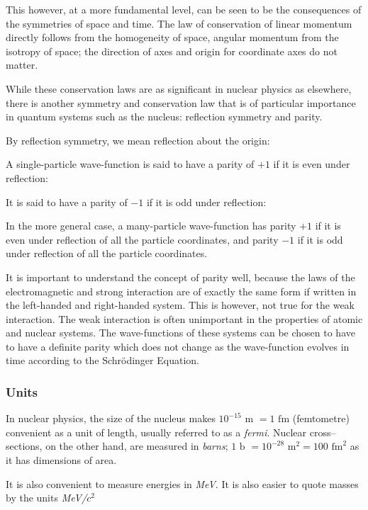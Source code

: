 This however, at a more fundamental level, can be seen to be the consequences of the symmetries of space and time. The law of conservation of linear momentum directly follows from the homogeneity of space, angular momentum from the isotropy of space; the direction of axes and origin for coordinate axes do not matter.

While these conservation laws are as significant in nuclear physics as elsewhere, there is another symmetry and conservation law that is of particular importance in quantum systems such as the nucleus: reflection symmetry and parity.

By reflection symmetry, we mean reflection about the origin:

A single-particle wave-function is said to have a parity of $+1$ if it is even under reflection:

It is said to have a parity of $-1$ if it is odd under reflection:

In the more general case, a many-particle wave-function has parity $+1$ if it is even under reflection of all the particle coordinates, and parity $-1$ if it is odd under reflection of all the particle coordinates.

It is important to understand the concept of parity well, because the laws of the electromagnetic and strong interaction are of exactly the same form if written in the left-handed and right-handed system. This is however, not true for the weak interaction. The weak interaction is often unimportant in the properties of atomic and nuclear systems. The wave-functions of these systems can be chosen to have to have a definite parity which does not change as the wave-function evolves in time according to the Schr\"{o}dinger Equation.

\subsubsection{Units}
In nuclear physics, the size of the nucleus makes $10^{-15} \text{ m } = 1 \text{ fm}$ (femtometre) convenient as a unit of length, usually referred to as a \emph{fermi}. Nuclear cross--sections, on the other hand, are measured in \emph{barns}; $1 \text{ b } = 10^{-28} \text{ m}^2 = 100 \text{ fm}^2$ as it has dimensions of area.

It is also convenient to measure energies in \emph{MeV}. It is also easier to quote masses by the units \emph{MeV/$c^2$}


